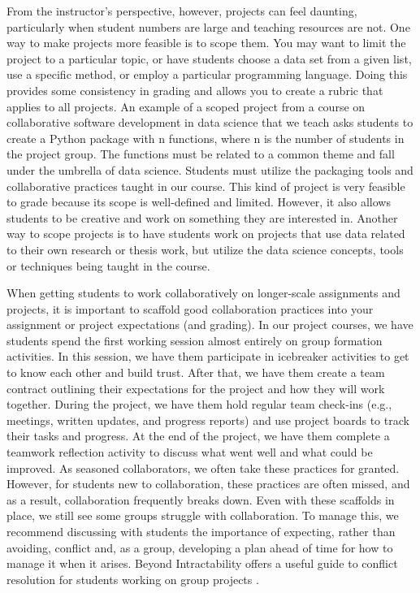 \documentclass[
  10pt,
  letterpaper,
]{article}
\begin{document}
From the instructor's perspective, however, projects can feel daunting,
particularly when student numbers are large and teaching resources are
not. One way to make projects more feasible is to scope them. You may
want to limit the project to a particular topic, or have students choose
a data set from a given list, use a specific method, or employ a
particular programming language. Doing this provides some consistency in
grading and allows you to create a rubric that applies to all projects.
An example of a scoped project from a course on collaborative software
development in data science that we teach asks students to create a
Python package with n functions, where n is the number of students in
the project group. The functions must be related to a common theme and
fall under the umbrella of data science. Students must utilize the
packaging tools and collaborative practices taught in our course. This
kind of project is very feasible to grade because its scope is
well-defined and limited. However, it also allows students to be
creative and work on something they are interested in. Another way to
scope projects is to have students work on projects that use data
related to their own research or thesis work, but utilize the data
science concepts, tools or techniques being taught in the course.

When getting students to work collaboratively on longer-scale
assignments and projects, it is important to scaffold good collaboration
practices into your assignment or project expectations (and grading). In
our project courses, we have students spend the first working session
almost entirely on group formation activities. In this session, we have
them participate in icebreaker activities to get to know each other and
build trust. After that, we have them create a team contract outlining
their expectations for the project and how they will work together.
During the project, we have them hold regular team check-ins (e.g.,
meetings, written updates, and progress reports) and use project boards
to track their tasks and progress. At the end of the project, we have
them complete a teamwork reflection activity to discuss what went well
and what could be improved. As seasoned collaborators, we often take
these practices for granted. However, for students new to collaboration,
these practices are often missed, and as a result, collaboration
frequently breaks down. Even with these scaffolds in place, we still see
some groups struggle with collaboration. To manage this, we recommend
discussing with students the importance of expecting, rather than
avoiding, conflict and, as a group, developing a plan ahead of time for
how to manage it when it arises. Beyond Intractability offers a useful
guide to conflict resolution for students working on group projects
\citep{burgess_group_projects}.
\end{document}
